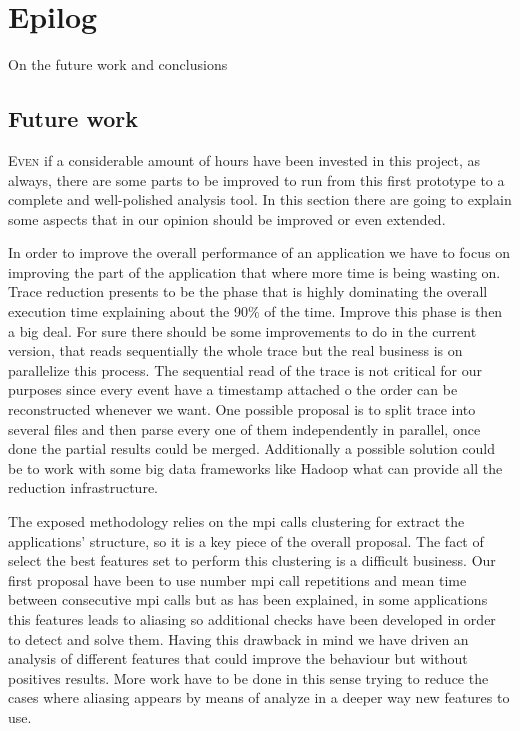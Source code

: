 \chapter{Epilog}

On the future work and conclusions

\section{Future work}

\lettrine{E}{ven} if a considerable amount of hours have been invested in this project, as 
always, there are some parts to be improved to run from this first prototype to
a complete and well-polished analysis tool. In this section there are going to
explain some aspects that in our opinion should be improved or even extended.


In order to improve the 
overall performance of an application we have to focus on improving the part of
the application that where more time is being wasting on. Trace reduction presents
to be the phase that is highly dominating the overall execution time explaining 
about the 90\% of the time. Improve this phase is then a big deal. For sure
there should be some improvements to do in the current version, that reads
sequentially the whole trace but the real business is on parallelize this
process. The sequential read of the trace is not critical for our purposes since
every event have a timestamp attached o the order can be reconstructed whenever
we want. One possible proposal is to split trace into several files and then
parse every one of them independently in parallel, once done the partial results 
could be merged. Additionally a possible solution could be to work with some
big data frameworks like Hadoop what can provide all the reduction
infrastructure.

The exposed methodology relies on the mpi calls clustering for extract the
applications' structure, so it is a key piece of the overall proposal. The fact
of select the best features set to perform this clustering is a difficult
business. Our first proposal have been to use number mpi call repetitions and
mean time between consecutive mpi calls but as has been explained, 
in some applications this
features leads to aliasing so additional checks have been developed in order to
detect and solve them. Having this drawback in mind we have driven an analysis 
of different
features that could improve the behaviour but without positives results. More work have 
to be done in this sense trying to reduce the cases where aliasing appears by
means of analyze in a deeper way new features to use.

